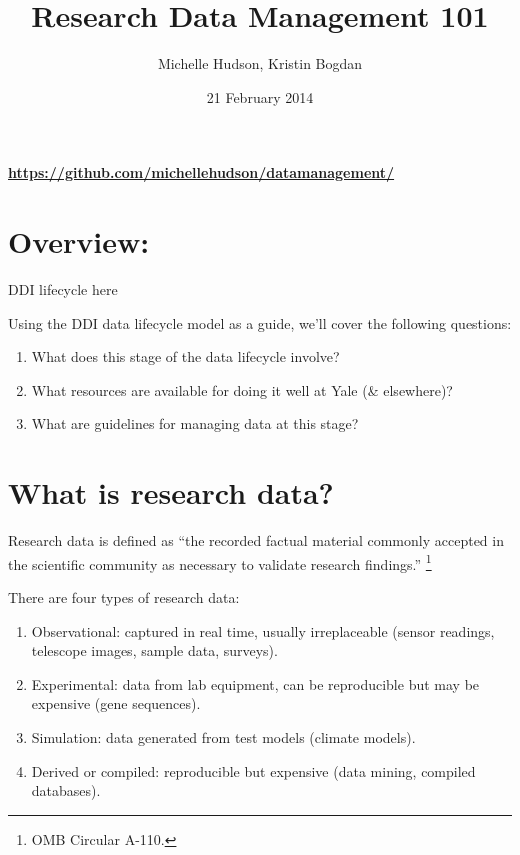 \documentclass{tufte-handout}
\title{Research Data Management 101}
\author[Michelle Hudson, Kristin Bogdan]{Michelle Hudson, Kristin Bogdan}
\date{21 February 2014}  %
\begin{document}
\maketitle%
\paragraph{\url{https://github.com/michellehudson/datamanagement/}}\label{httpsgithub.commichellehudsondatamanagement} 

\section{Overview:}\label{overview}
DDI lifecycle here

Using the DDI data lifecycle model as a guide, we'll cover the following
questions: 

\begin{enumerate}
\def\labelenumi{\arabic{enumi}.}
\itemsep1pt\parskip0pt
\item
  What does this stage of the data lifecycle involve?
\item
  What resources are available for doing it well at Yale (\& elsewhere)?
\item
  What are guidelines for managing data at this stage?
\end{enumerate}


\section{What is research data?}\label{what-is-research-data}

Research data is defined as ``the recorded factual material commonly
accepted in the scientific community as necessary to validate research
findings.'' \footnote {OMB Circular A-110.}

There are four types of research data: 

\begin{enumerate}
\def\labelenumi{\arabic{enumi}.}
\itemsep1pt\parskip0pt
\item
  Observational: captured in real time, usually irreplaceable (sensor readings, telescope images, sample data, surveys).
\item
  Experimental: data from lab equipment, can be reproducible but may be expensive (gene sequences).
\item
  Simulation: data generated from test models (climate models).
\item
  Derived or compiled: reproducible but expensive (data mining, compiled databases).
\end{enumerate}
\end{document}
